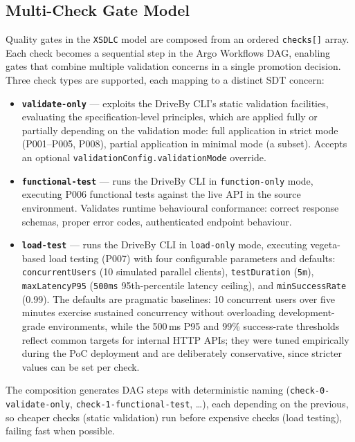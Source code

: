 \subsection{Multi-Check Gate Model}
\label{subsec:multi-check-gates}
\label{subsec:gate-types}

Quality gates in the \texttt{XSDLC} model are composed from an ordered \texttt{checks[]} array. Each check becomes a sequential step in the Argo Workflows DAG, enabling gates that combine multiple validation concerns in a single promotion decision. Three check types are supported, each mapping to a distinct SDT concern:

\begin{itemize}
    \item \textbf{\texttt{validate-only}} --- exploits the DriveBy CLI's static validation facilities, evaluating the specification-level principles, which are applied fully or partially depending on the validation mode: full application in strict mode (P001--P005, P008), partial application in minimal mode (a subset). Accepts an optional \texttt{validationConfig.\allowbreak validationMode} override.
    \item \textbf{\texttt{functional-test}} --- runs the DriveBy CLI in \texttt{function-only} mode, executing P006 functional tests against the live API in the source environment. Validates runtime behavioural conformance: correct response schemas, proper error codes, authenticated endpoint behaviour.
    \item \textbf{\texttt{load-test}} --- runs the DriveBy CLI in \texttt{load-only} mode, executing vegeta-based load testing (P007) with four configurable parameters and defaults: \texttt{concurrentUsers} (10 simulated parallel clients), \texttt{testDuration} (\texttt{5m}), \texttt{maxLatencyP95} (\texttt{500ms} 95th-percentile latency ceiling), and \texttt{minSuccessRate} (0.99). The defaults are pragmatic baselines: 10 concurrent users over five minutes exercise sustained concurrency without overloading development-grade environments, while the 500\,ms P95 and 99\% success-rate thresholds reflect common targets for internal HTTP APIs; they were tuned empirically during the PoC deployment and are deliberately conservative, since stricter values can be set per check.
\end{itemize}

The composition generates DAG steps with deterministic naming (\texttt{check-0-\allowbreak validate-only}, \texttt{check-1-\allowbreak functional-test}, \ldots), each depending on the previous, so cheaper checks (static validation) run before expensive checks (load testing), failing fast when possible.

